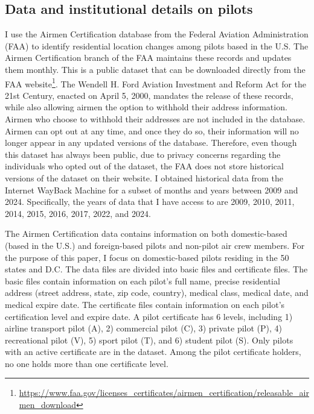 \documentclass[11pt]{article}
\begin{document}
\subsection{Data and institutional details on pilots}
 I use the Airmen Certification database from the Federal Aviation Administration (FAA) to identify residential location changes among pilots based in the U.S. The Airmen Certification branch of the FAA maintains these records and updates them monthly. This is a public dataset that can be downloaded directly from the FAA website\footnote{\url{https://www.faa.gov/licenses_certificates/airmen_certification/releasable_airmen_download}}. The Wendell H. Ford Aviation Investment and Reform Act for the 21st Century, enacted on April 5, 2000, mandates the release of these records, while also allowing airmen the option to withhold their address information. Airmen who choose to withhold their addresses are not included in the database. Airmen can opt out at any time, and once they do so, their information will no longer appear in any updated versions of the database. Therefore, even though this dataset has always been public, due to privacy concerns regarding the individuals who opted out of the dataset, the FAA does not store historical versions of the dataset on their website. I obtained historical data from the Internet WayBack Machine for a subset of months and years between 2009 and 2024. Specifically, the years of data that I have access to are 2009, 2010, 2011, 2014, 2015, 2016, 2017, 2022, and 2024. 

The Airmen Certification data contains information on both domestic-based (based in the U.S.) and foreign-based pilots and non-pilot air crew members. For the purpose of this paper, I focus on domestic-based pilots residing in the 50 states and D.C. The data files are divided into basic files and certificate files. The basic files contain information on each pilot's full name, precise residential address (street address, state, zip code, country), medical class, medical date, and medical expire date. The certificate files contain information on each pilot's certification level and expire date. A pilot certificate has 6 levels, including 1) airline transport pilot (A), 2) commercial pilot (C), 3) private pilot (P), 4) recreational pilot (V), 5) sport pilot (T), and 6) student pilot (S). Only pilots with an active certificate are in the dataset. Among the pilot certificate holders, no one holds more than one certificate level. 
\end{document}
